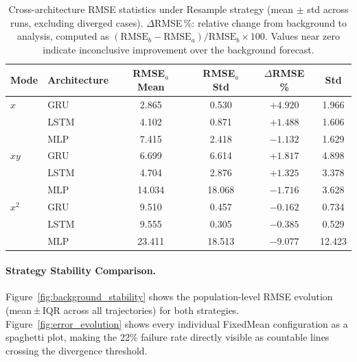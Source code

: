 \documentclass[12pt,a4paper]{article}
\begin{document}
\begin{table}[H]
\centering
\small
\caption{Cross-architecture RMSE statistics under Resample strategy (mean $\pm$ std across runs, excluding diverged cases). $\Delta$RMSE\,\%: relative change from background to analysis, computed as $(\text{RMSE}_b - \text{RMSE}_a) / \text{RMSE}_b \times 100$. Values near zero indicate inconclusive improvement over the background forecast.}
\label{tab:resample_stats}
\begin{tabularx}{0.95\textwidth}{l l c c c c}
\toprule
\textbf{Mode} & \textbf{Architecture} & \textbf{RMSE$_a$ Mean} & \textbf{RMSE$_a$ Std} & \textbf{$\Delta$RMSE \%} & \textbf{Std} \\
\midrule
$x$   & GRU  & 2.865 & 0.530 & $+4.920$ & 1.966 \\
      & LSTM & 4.102 & 0.871 & $+1.488$ & 1.606 \\
      & MLP  & 7.415 & 2.418 & $-1.132$ & 1.629 \\
$xy$  & GRU  & 6.699 & 6.614 & $+1.817$ & 4.898 \\
      & LSTM & 4.704 & 2.876 & $+1.325$ & 3.378 \\
      & MLP  & 14.034 & 18.068 & $-1.716$ & 3.628 \\
$x^2$ & GRU  & 9.510 & 0.457 & $-0.162$ & 0.734 \\
      & LSTM & 9.555 & 0.305 & $-0.385$ & 0.529 \\
      & MLP  & 23.411 & 18.513 & $-9.077$ & 12.423 \\
\bottomrule
\end{tabularx}
\end{table}

\paragraph{Strategy Stability Comparison.} Figure~\ref{fig:background_stability} shows the population-level RMSE evolution (mean\,±\,IQR across all trajectories) for both strategies. Figure~\ref{fig:error_evolution} shows every individual FixedMean configuration as a spaghetti plot, making the 22\% failure rate directly visible as countable lines crossing the divergence threshold.
\end{document}
